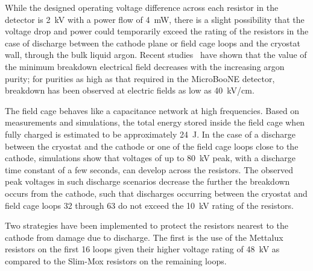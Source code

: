 While the designed operating voltage difference across each resistor in the detector is 2~kV with a power flow of 4~mW, there is a slight possibility that the voltage drop and power could temporarily exceed the rating of the resistors in the case of discharge between the cathode plane or field cage loops and the cryostat wall, through the bulk liquid argon. Recent studies~\cite{Acciarri:2014ica} have shown that the value of the minimum breakdown electrical field decreases with the increasing argon purity; for purities as high as that required in the MicroBooNE detector, breakdown has been observed at electric fields as low as 40~kV/cm.

The field cage behaves like a capacitance network at high frequencies. Based on measurements and simulations, the total energy stored inside the field cage when fully charged is estimated to be approximately 24~J. In the case of a discharge between the cryostat and the cathode or one of the field cage loops close to the cathode, simulations show that voltages of up to 80~kV peak, with a discharge time constant of a few seconds, can develop across the resistors. The observed peak voltages in such discharge scenarios decrease the further the breakdown occurs from the cathode, such that discharges occurring between the cryostat and field cage loops 32 through 63 do not exceed the 10~kV rating of the resistors.

Two strategies have been implemented to protect the resistors nearest to the cathode from damage due to discharge.   The first is the use of the Mettalux resistors on the first 16 loops given their higher voltage rating of 48~kV as compared to the Slim-Mox resistors on the remaining loops.      



